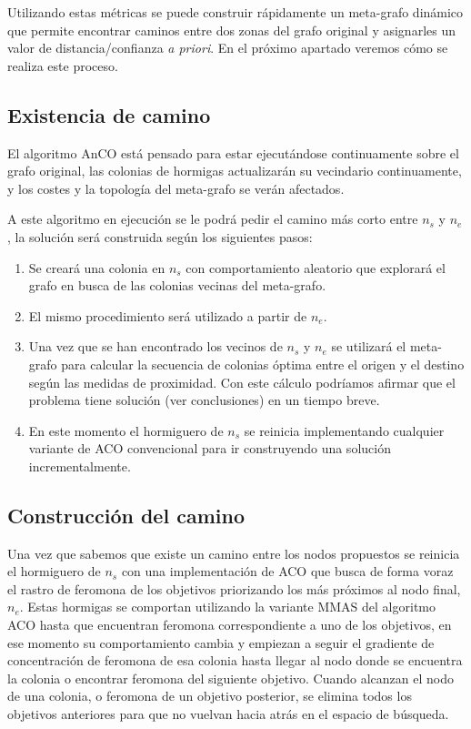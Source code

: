 \documentclass{llncs}
\begin{document}
Utilizando estas m{\'e}tricas se puede construir r{\'a}pidamente un meta-grafo din{\'a}mico que permite encontrar caminos entre dos zonas del grafo original y asignarles un valor de distancia/confianza \textit{a priori}.
En el pr{\'o}ximo apartado veremos c{\'o}mo se realiza este proceso.

\subsection{Existencia de camino}
El algoritmo AnCO est{\'a} pensado para estar ejecut{\'a}ndose continuamente sobre el grafo original, las colonias de hormigas actualizar{\'a}n su vecindario continuamente, y los costes y la topolog{\'i}a del meta-grafo se ver{\'a}n afectados.

A este algoritmo en ejecuci{\'o}n se le podr{\'a} pedir el camino m{\'a}s corto entre $n_s$ y $n_e$, la soluci{\'o}n ser{\'a} construida seg{\'u}n los siguientes pasos:

\begin{enumerate}
  \item Se crear{\'a} una colonia en $n_s$ con comportamiento aleatorio que explorar{\'a} el grafo en busca de las colonias vecinas del meta-grafo.
  \item El mismo procedimiento ser{\'a} utilizado a partir de $n_e$.
  \item Una vez que se han encontrado los vecinos de $n_s$ y $n_e$ se utilizar{\'a} el meta-grafo para calcular la secuencia de colonias {\'o}ptima entre el origen y el destino seg{\'u}n las medidas de proximidad. Con este c{\'a}lculo podr{\'i}amos afirmar que el problema tiene soluci{\'o}n (ver conclusiones) en un tiempo breve.
  \item En este momento el hormiguero de $n_s$ se reinicia implementando cualquier variante de ACO convencional para ir construyendo una soluci{\'o}n incrementalmente.
\end{enumerate}

\subsection{Construcci{\'o}n del camino}
Una vez que sabemos que existe un camino entre los nodos propuestos se reinicia el hormiguero de $n_s$ con una implementaci{\'o}n de ACO que busca de forma voraz el rastro de feromona de los objetivos priorizando los m{\'a}s pr{\'o}ximos al nodo final, $n_e$.
Estas hormigas se comportan utilizando la variante MMAS del algoritmo ACO hasta que encuentran feromona correspondiente a uno de los objetivos, en ese momento su comportamiento cambia y empiezan a seguir el gradiente de concentraci{\'o}n de feromona de esa colonia hasta llegar al nodo donde se encuentra la colonia o encontrar feromona del siguiente objetivo.
Cuando alcanzan el nodo de una colonia, o feromona de un objetivo posterior, se elimina todos los objetivos anteriores para que no vuelvan hacia atr{\'a}s en el espacio de b{\'u}squeda.
\end{document}
